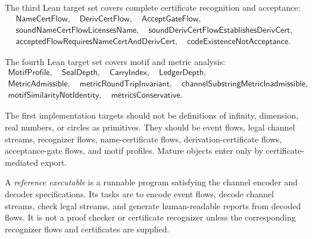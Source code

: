 \begin{definition}
\label{def:implementation-interface-certificate-lean-targets}
The third Lean target set covers complete certificate recognition and acceptance:
$$
\begin{gathered}
  \mathsf{NameCertFlow},\quad
  \mathsf{DerivCertFlow},\quad
  \mathsf{AcceptGateFlow},\\
  \mathsf{soundNameCertFlowLicensesName},\quad
  \mathsf{soundDerivCertFlowEstablishesDerivCert},\\
  \mathsf{acceptedFlowRequiresNameCertAndDerivCert},\quad
  \mathsf{codeExistenceNotAcceptance}.
\end{gathered}
$$
\end{definition}

\begin{definition}
\label{def:implementation-interface-analysis-lean-targets}
The fourth Lean target set covers motif and metric analysis:
$$
\begin{gathered}
  \mathsf{MotifProfile},\quad
  \mathsf{SealDepth},\quad
  \mathsf{CarryIndex},\quad
  \mathsf{LedgerDepth},\\
  \mathsf{MetricAdmissible},\quad
  \mathsf{metricRoundTripInvariant},\quad
  \mathsf{channelSubstringMetricInadmissible},\\
  \mathsf{motifSimilarityNotIdentity},\quad
  \mathsf{metricsConservative}.
\end{gathered}
$$
\end{definition}

\begin{remark}
\label{rem:implementation-interface-do-not-formalize-high-level-first}
The first implementation targets should not be definitions of infinity, dimension, real numbers, or circles as primitives. They should be event flows, legal channel streams, recognizer flows, name-certificate flows, derivation-certificate flows, acceptance-gate flows, and motif profiles. Mature objects enter only by certificate-mediated export.
\end{remark}

\begin{definition}
\label{def:implementation-interface-reference-executable}
A \emph{reference executable} is a runnable program satisfying the channel encoder and decoder specifications. Its tasks are to encode event flows, decode channel streams, check legal streams, and generate human-readable reports from decoded flows. It is not a proof checker or certificate recognizer unless the corresponding recognizer flows and certificates are supplied.
\end{definition}

